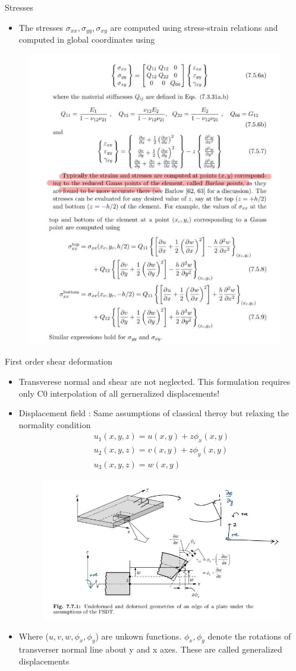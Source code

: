 	\begin{frame}{Stresses}
		\begin{itemize}
			\item The stresses $\sigma_{xx},\sigma_{yy},\sigma_{xy}$ are computed using stress-strain relations and computed in global coordinates using 		
		\end{itemize}
		\begin{figure}
			\centering
			\includegraphics[width=0.5\linewidth]{Figure/fig42}  		
		\end{figure}
	\end{frame}

	
	\begin{frame}{First order shear deformation}
		\begin{itemize}
			\item Transverese normal and shear are not neglected. This formulation requires only C0 interpolation of all gerneralized displacements!
			\item Displacement field : Same assumptions of classical theroy but relaxing the normality condition
			\begin{equation}
			\begin{aligned}
				u_1(x,y,z) = u(x,y) + z\phi_x(x,y)\\
				u_2(x,y,z) = v(x,y) + z\phi_y(x,y)\\
				u_3(x,y,z) = w(x,y) 
			\end{aligned}
			\end{equation}
			\begin{figure}
				\centering
				\includegraphics[width=0.55\linewidth]{Figure/fig44}  		
			\end{figure}
			\item Where ($u,v,w,\phi_x,\phi_y$) are unkown functions. $\phi_x,\phi_y$ denote the rotations of transverser normal line about y and x axes. These are called generalized displacements
		\end{itemize}
	\end{frame}



